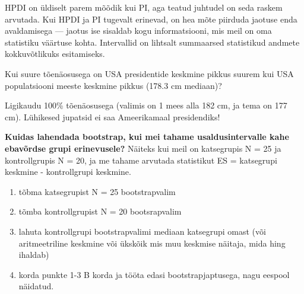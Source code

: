 \documentclass[]{book}
\newenvironment{Shaded}{\begin{snugshade}}{\end{snugshade}}
\newcommand{\KeywordTok}[1]{\textcolor[rgb]{0.13,0.29,0.53}{\textbf{#1}}}
\newcommand{\DataTypeTok}[1]{\textcolor[rgb]{0.13,0.29,0.53}{#1}}
\newcommand{\FloatTok}[1]{\textcolor[rgb]{0.00,0.00,0.81}{#1}}
\newcommand{\StringTok}[1]{\textcolor[rgb]{0.31,0.60,0.02}{#1}}
\newcommand{\CommentTok}[1]{\textcolor[rgb]{0.56,0.35,0.01}{\textit{#1}}}
\newcommand{\OperatorTok}[1]{\textcolor[rgb]{0.81,0.36,0.00}{\textbf{#1}}}
\newcommand{\NormalTok}[1]{#1}
\begin{document}
\begin{Shaded}
\end{Shaded}

HPDI on üldiselt parem mõõdik kui PI, aga teatud juhtudel on seda raskem
arvutada. Kui HPDI ja PI tugevalt erinevad, on hea mõte piirduda jaotuse
enda avaldamisega --- jaotus ise sisaldab kogu informatsiooni, mis meil
on oma statistiku väärtuse kohta. Intervallid on lihtsalt summaarsed
statistikud andmete kokkuvõtlikuks esitamiseks.

Kui suure tõenäosusega on USA presidentide keskmine pikkus suurem kui
USA populatsiooni meeste keskmine pikkus (178.3 cm mediaan)?

\begin{Shaded}
\end{Shaded}

Ligikaudu 100\% tõenäosusega (valimis on 1 mees alla 182 cm, ja tema on
177 cm). Lühikesed jupatsid ei saa Ameerikamaal presidendiks!

\textbf{Kuidas lahendada bootstrap, kui mei tahame usaldusintervalle
kahe ebavõrdse grupi erinevusele?} Näiteks kui meil on katsegrupis N =
25 ja kontrollgrupis N = 20, ja me tahame arvutada statistikut ES =
katsegrupi keskmine - kontrollgrupi keskmine.

\begin{enumerate}
\def\labelenumi{\arabic{enumi}.}
\item
  tõbma katsegrupist N = 25 bootstrapvalim
\item
  tõmba kontrollgrupist N = 20 bootsrapvalim
\item
  lahuta kontrollgrupi bootstrapvalimi mediaan katsegrupi omast (või
  aritmeetriline keskmine või ükskõik mis muu keskmise näitaja, mida
  hing ihaldab)
\item
  korda punkte 1-3 B korda ja tööta edasi bootstrapjaptusega, nagu
  eespool näidatud.
\end{enumerate}
\end{document}
